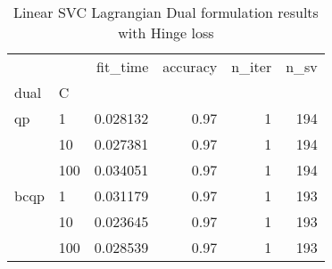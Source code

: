 \begin{table}[H]
\centering
\caption{Linear SVC Lagrangian Dual formulation results with Hinge loss}
\label{linear_lagrangian_dual_svc_cv_results}
\begin{tabular}{llrrrr}
\toprule
     &     &  fit\_time &  accuracy &  n\_iter &  n\_sv \\
dual & C &           &           &         &       \\
\midrule
qp & 1   &  0.028132 &      0.97 &       1 &   194 \\
     & 10  &  0.027381 &      0.97 &       1 &   194 \\
     & 100 &  0.034051 &      0.97 &       1 &   194 \\
bcqp & 1   &  0.031179 &      0.97 &       1 &   193 \\
     & 10  &  0.023645 &      0.97 &       1 &   193 \\
     & 100 &  0.028539 &      0.97 &       1 &   193 \\
\bottomrule
\end{tabular}
\end{table}
